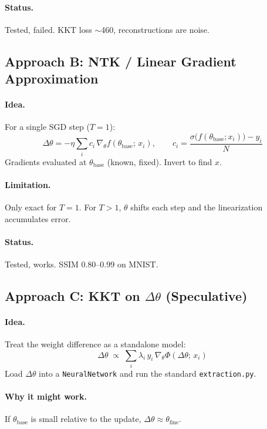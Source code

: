 \documentclass[11pt,a4paper]{article}
\begin{document}
\paragraph{Status.} \colorbox{red!15}{Tested, failed.} KKT loss $\sim$460, reconstructions are noise.

\subsection{Approach B: NTK / Linear Gradient Approximation}

\paragraph{Idea.} For a single SGD step ($T=1$):
\[
  \Delta\theta = -\eta \sum_i c_i \,\nabla_\theta f(\theta_{\mathrm{base}};\, x_i),
  \qquad c_i = \frac{\sigma\!\bigl(f(\theta_{\mathrm{base}}; x_i)\bigr) - y_i}{N}
\]
Gradients evaluated at $\theta_{\mathrm{base}}$ (known, fixed). Invert to find $x$.

\paragraph{Limitation.} Only exact for $T=1$. For $T>1$, $\theta$ shifts each step and the linearization accumulates error.

\paragraph{Status.} \colorbox{green!15}{Tested, works.} SSIM 0.80--0.99 on MNIST.

\subsection{Approach C: KKT on $\Delta\theta$ (Speculative)}

\paragraph{Idea.} Treat the weight difference as a standalone model:
\[
  \Delta\theta \;\propto\; \sum_i \lambda_i \, y_i \,\nabla_\theta \Phi(\Delta\theta;\, x_i)
\]
Load $\Delta\theta$ into a \texttt{NeuralNetwork} and run the standard \texttt{extraction.py}.

\paragraph{Why it might work.} If $\theta_{\mathrm{base}}$ is small relative to the update, $\Delta\theta \approx \theta_{\mathrm{fine}}$.
\end{document}
